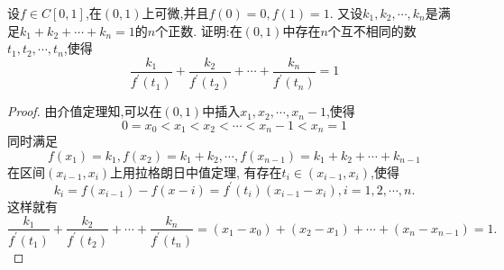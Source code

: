 \documentclass[lang=cn,newtx,10pt,scheme=chinese]{elegantbook}
\begin{document}
\begin{exercise}
设$f\in C[0,1]$,在$(0,1)$上可微,并且$f(0)=0,f(1)=1$.
又设$k_1,k_2,\cdots,k_n$是满足$k_1+k_2+\cdots+k_n=1$的$n$个正数.
证明:在$(0,1)$中存在$n$个互不相同的数$t_1,t_2,\cdots,t_n$,使得
\begin{equation}
    \frac{k_1}{f^{\prime}\left( t_1 \right)}+\frac{k_2}{f^{\prime}\left( t_2 \right)}+\cdots +\frac{k_n}{f^{\prime}\left( t_n \right)}=1
    \nonumber
\end{equation}

    \begin{proof}
        由介值定理知,可以在$(0,1)$中插入$x_1,x_2,\cdots,x_n-1$,使得
        \begin{equation}
            0=x_0<x_1<x_2<\cdots<x_n-1<x_n=1
            \nonumber
        \end{equation}
        同时满足
    \begin{equation}
        f(x_1)=k_1,f(x_2)=k_1+k_2,\cdots ,f(x_{n-1})=k_1+k_2+\cdots +k_{n-1}
        \nonumber
    \end{equation}
    在区间$(x_{i-1},x_i)$上用拉格朗日中值定理,
    有存在$t_i\in (x_{i-1},x_i)$,使得
    \begin{equation}
        k_i=f(x_{i-1})-f(x-i)=f^{\prime}(t_i)(x_{i-1}-x_i),i=1,2,\cdots,n.
    \nonumber
    \end{equation}
    这样就有
    \begin{equation}
        \frac{k_1}{f^{\prime}\left( t_1 \right)}+\frac{k_2}{f^{\prime}\left( t_2 \right)}+\cdots +\frac{k_n}{f^{\prime}\left( t_n \right)}=
        \left( x_1-x_0 \right) +\left( x_2-x_1 \right) +\cdots +\left( x_n-x_{n-1} \right) =1.
        \nonumber
    \end{equation}
    \end{proof}

\end{exercise}
\end{document}
